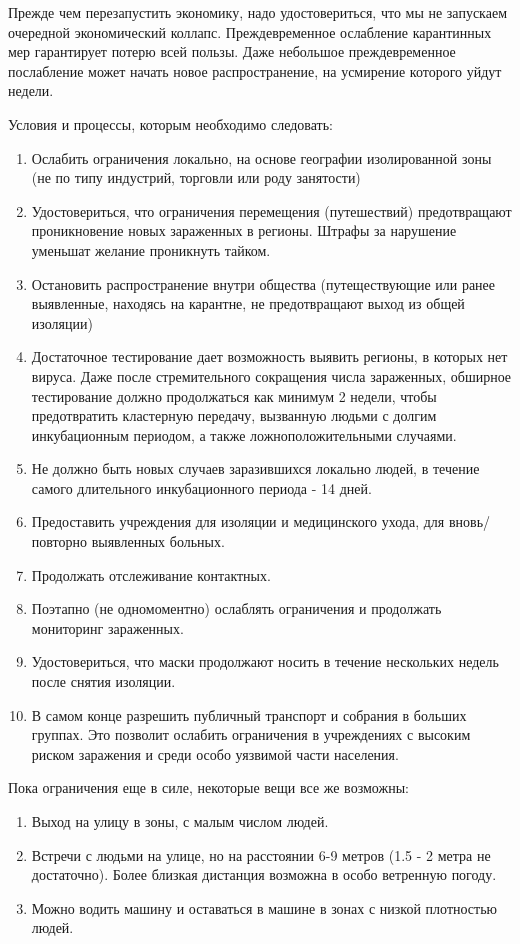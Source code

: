 \documentclass[onecolumn,journal]{IEEEtran}
\begin{document}
\large
\begin{multicols}{2}

Прежде чем перезапустить экономику, надо удостовериться, что мы не запускаем очередной экономический коллапс. Преждевременное ослабление карантинных мер гарантирует потерю всей пользы. Даже небольшое преждевременное послабление может начать новое распространение, на усмирение которого уйдут недели.

Условия и процессы, которым необходимо следовать:
\begin{enumerate}
\item Ослабить ограничения локально, на основе географии изолированной зоны (не по типу индустрий, торговли или роду занятости)
\item Удостовериться, что ограничения перемещения (путешествий) предотвращают проникновение новых зараженных в регионы. Штрафы за нарушение уменьшат желание проникнуть тайком.
\item Остановить распространение внутри общества (путеществующие или ранее выявленные, находясь на карантне, не предотвращают выход из общей изоляции)
\item Достаточное тестирование дает возможность выявить регионы, в которых нет вируса. Даже после стремительного сокращения числа зараженных, обширное тестирование должно продолжаться как минимум 2 недели, чтобы предотвратить кластерную передачу, вызванную людьми с долгим инкубационным периодом, а также ложноположительными случаями.
\item Не должно быть новых случаев заразившихся локально людей, в течение самого длительного инкубационного периода - 14 дней.
\item Предоставить учреждения для изоляции и медицинского ухода, для вновь/повторно выявленных больных.
\item Продолжать отслеживание контактных.
\item Поэтапно (не одномоментно) ослаблять ограничения и продолжать мониторинг зараженных.
\item Удостовериться, что маски продолжают носить в течение нескольких недель после снятия изоляции.
\item В самом конце разрешить публичный транспорт и собрания в больших группах. Это позволит ослабить ограничения в учреждениях с высоким риском заражения и среди особо уязвимой части населения.
\end{enumerate}

Пока ограничения еще в силе, некоторые вещи все же возможны:
\begin{enumerate}
\item Выход на улицу в зоны, с малым числом людей.
\item Встречи с людьми на улице, но на расстоянии 6-9 метров (1.5 - 2 метра не достаточно). Более близкая дистанция возможна в особо ветренную погоду.
\item Можно водить машину и оставаться в машине в зонах с низкой плотностью людей.
\end{enumerate}


\end{multicols}
\end{document}

